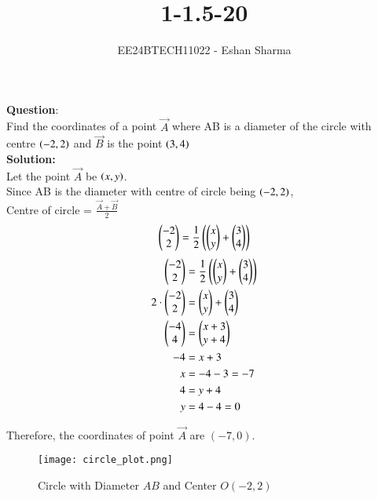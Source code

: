 \documentclass[journal]{IEEEtran}
\begin{document}

\vspace{3cm}

\title{1-1.5-20}
\author{EE24BTECH11022 - Eshan Sharma
}
{\let\newpage\relax\maketitle}

\renewcommand{\thefigure}{\theenumi}
\renewcommand{\thetable}{\theenumi}
\setlength{\intextsep}{10pt} %


\renewcommand{\thetable}{\theenumi}


\textbf{Question}:\\
Find the coordinates of a point $\vec{A}$ where AB is a diameter of the circle with centre $\left(-2,2\right)$ and $\vec{B}$ is the point $\left(3,4\right)$
\\
\textbf{Solution:}\\
Let the point $\vec{A}$ be $\left(x,y\right)$.\\
Since AB is the diameter with centre of circle being $\left(-2,2\right)$,\\
Centre of circle = $\frac{\vec{A}+\vec{B}}{2}$\\

\begin{align}
    \begin{pmatrix}
        -2
        \\
        2
    \end{pmatrix}
    =
    \frac{1}{2} \left(
    \begin{pmatrix}
        x
        \\
        y
    \end{pmatrix}
    +
    \begin{pmatrix}
        3
        \\
        4
    \end{pmatrix}
    \right)
\end{align}
\begin{align}
    \begin{pmatrix}-2 \\ 2\end{pmatrix} &= \frac{1}{2} \left( \begin{pmatrix}x \\ y\end{pmatrix} + \begin{pmatrix}3 \\ 4\end{pmatrix} \right) \\
    2 \cdot \begin{pmatrix}-2 \\ 2\end{pmatrix} &= \begin{pmatrix}x \\ y\end{pmatrix} + \begin{pmatrix}3 \\ 4\end{pmatrix} \\
    \begin{pmatrix}-4 \\ 4\end{pmatrix} &= \begin{pmatrix}x + 3 \\ y + 4\end{pmatrix} \\
    -4 &= x + 3 \\
    x &= -4 - 3 = -7 \\
    4 &= y + 4 \\
    y &= 4 - 4 = 0
\end{align}

Therefore, the coordinates of point $\vec{A}$ are $\boxed{(-7, 0)}$.

\begin{figure}[h]
    \centering
    \texttt{[image: circle\_plot.png]}
    \caption{Circle with Diameter \( AB \) and Center \( O(-2, 2) \)}
    \label{fig:circle_plot}
\end{figure}
\end{document}
